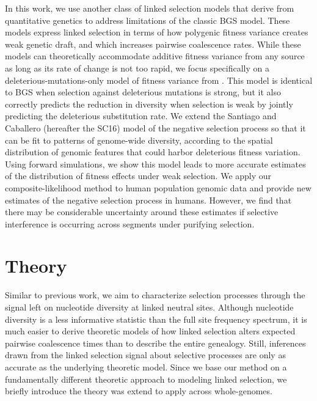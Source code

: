 \documentclass[11pt]{article}
\begin{document}
In this work, we use another class of linked selection models that derive from
quantitative genetics to address limitations of the classic BGS model. These
models express linked selection in terms of how polygenic fitness variance
creates weak genetic draft, and which increases pairwise coalescence rates.
While these models can theoretically accommodate additive fitness variance from
any source as long as its rate of change is not too rapid, we focus
specifically on a deleterious-mutations-only model of fitness variance from
\textcite{Santiago2016-mu}. This model is identical to BGS when selection
against deleterious mutations is strong, but it also correctly predicts the
reduction in diversity when selection is weak by jointly predicting the
deleterious substitution rate. We extend the Santiago and Caballero (hereafter
the SC16) model of the negative selection process so that it can be fit to
patterns of genome-wide diversity, according to the spatial distribution of
genomic features that could harbor deleterious fitness variation. Using forward
simulations, we show this model leads to more accurate estimates of the
distribution of fitness effects under weak selection. We apply our
composite-likelihood method to human population genomic data and provide new
estimates of the negative selection process in humans. However, we find that
there may be considerable uncertainty around these estimates if selective
interference is occurring across segments under purifying selection.

\section*{Theory}

Similar to previous work, we aim to characterize selection processes through
the signal left on nucleotide diversity at linked neutral sites. Although
nucleotide diversity is a less informative statistic than the full site
frequency spectrum, it is much easier to derive theoretic models of how linked
selection alters expected pairwise coalescence times than to describe the
entire genealogy. Still, inferences drawn from the linked selection signal
about selective processes are only as accurate as the underlying theoretic
model. Since we base our method on a fundamentally different theoretic approach
to modeling linked selection, we briefly introduce the theory was extend to
apply across whole-genomes.
\end{document}
